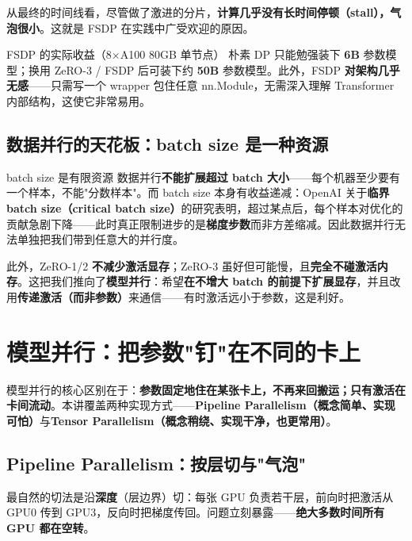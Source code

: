\documentclass[a4paper]{article}
\begin{document}
从最终的时间线看，尽管做了激进的分片，\textbf{计算几乎没有长时间停顿（stall），气泡很小}。这就是 FSDP 在实践中广受欢迎的原因。

\begin{practicebox}{FSDP 的实际收益（8$\times$A100 80GB 单节点）}
朴素 DP 只能勉强装下 \textbf{6B} 参数模型；换用 ZeRO-3 / FSDP 后可装下约 \textbf{50B} 参数模型。此外，FSDP \textbf{对架构几乎无感}——只需写一个 wrapper 包住任意 nn.Module，无需深入理解 Transformer 内部结构，这使它非常易用。
\end{practicebox}

\subsection{数据并行的天花板：batch size 是一种资源}

\begin{warningbox}{batch size 是有限资源}
数据并行\textbf{不能扩展超过 batch 大小}——每个机器至少要有一个样本，不能"分数样本"。而 batch size 本身有收益递减：OpenAI 关于\textbf{临界 batch size（critical batch size）}的研究表明，超过某点后，每个样本对优化的贡献急剧下降——此时真正限制进步的是\textbf{梯度步数}而非方差缩减。因此数据并行无法单独把我们带到任意大的并行度。
\end{warningbox}

此外，ZeRO-1/2 \textbf{不减少激活显存}；ZeRO-3 虽好但可能慢，且\textbf{完全不碰激活内存}。这把我们推向了\textbf{模型并行}：希望\textbf{在不增大 batch 的前提下扩展显存}，并且改用\textbf{传递激活（而非参数）}来通信——有时激活远小于参数，这是利好。

\section{模型并行：把参数"钉"在不同的卡上}

模型并行的核心区别在于：\textbf{参数固定地住在某张卡上，不再来回搬运；只有激活在卡间流动}。本讲覆盖两种实现方式——\textbf{Pipeline Parallelism（概念简单、实现可怕）}与\textbf{Tensor Parallelism（概念稍绕、实现干净，也更常用）}。

\subsection{Pipeline Parallelism：按层切与"气泡"}

最自然的切法是沿\textbf{深度}（层边界）切：每张 GPU 负责若干层，前向时把激活从 GPU0 传到 GPU3，反向时把梯度传回。问题立刻暴露——\textbf{绝大多数时间所有 GPU 都在空转}。
\end{document}
